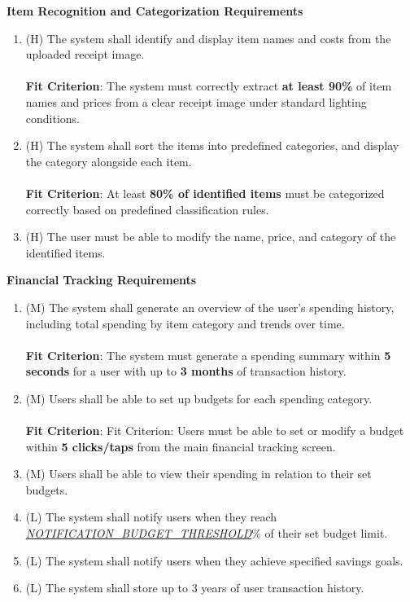 \documentclass[12pt]{article}
\begin{document}
\textbf{Item Recognition and Categorization Requirements}\label{FR-RS}
\begin{enumerate}[label=FR-RS-\arabic*]
  \item (H) The system shall identify and display item names and costs from the
  uploaded receipt image.
  \\ \\ \textbf{Fit Criterion}: The system must correctly extract \textbf{at least 90\%} of item names and prices from a clear receipt image under standard lighting conditions.
  \item (H) The system shall sort the items into predefined categories, and
  display the category alongside each item.
  \\ \\ \textbf{Fit Criterion}: At least \textbf{80\% of identified items} must be categorized correctly based on predefined classification rules.
  \item (H) The user must be able to modify the name, price, and category of the
  identified items.   
\end{enumerate}

\textbf{Financial Tracking Requirements}\label{FR-FT}
\begin{enumerate}[label=FR-FT-\arabic*]
  \item (M) The system shall generate an overview of the user's spending history,
  including total spending by item category and trends over time.
  \\ \\ \textbf{Fit Criterion}: The system must generate a spending summary within \textbf{5 seconds} for a user with up to \textbf{3 months} of transaction history.
  \item (M) Users shall be able to set up budgets for each spending category.
  \\ \\ \textbf{Fit Criterion}: Fit Criterion: Users must be able to set or modify a budget within \textbf{5 clicks/taps} from the main financial tracking screen.
  \item (M) Users shall be able to view their spending in relation to their set
  budgets.
  \item (L) The system shall notify users when they reach
  \hyperref[Table:AuxConstants]{\textit{NOTIFICATION\_BUDGET\_THRESHOLD}}\%
  of their set budget limit.
  \item (L) The system shall notify users when they achieve specified savings goals.
  \item (L) The system shall store up to 3 years of user transaction history.
\end{enumerate}
\end{document}
